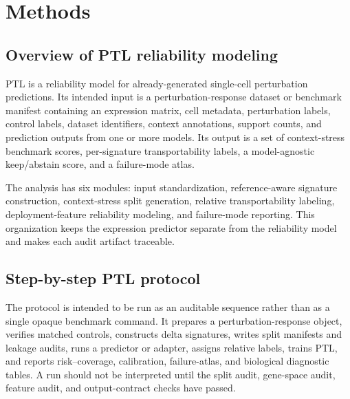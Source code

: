 \section{Methods}

\subsection{Overview of PTL reliability modeling}

PTL is a reliability model for already-generated single-cell perturbation predictions. Its intended input is a perturbation-response dataset or benchmark manifest containing an expression matrix, cell metadata, perturbation labels, control labels, dataset identifiers, context annotations, support counts, and prediction outputs from one or more models. Its output is a set of context-stress benchmark scores, per-signature transportability labels, a model-agnostic keep/abstain score, and a failure-mode atlas.

The analysis has six modules: input standardization, reference-aware signature construction, context-stress split generation, relative transportability labeling, deployment-feature reliability modeling, and failure-mode reporting. This organization keeps the expression predictor separate from the reliability model and makes each audit artifact traceable.

\subsection{Step-by-step PTL protocol}

The protocol is intended to be run as an auditable sequence rather than as a single opaque benchmark command. It prepares a perturbation-response object, verifies matched controls, constructs delta signatures, writes split manifests and leakage audits, runs a predictor or adapter, assigns relative labels, trains PTL, and reports risk--coverage, calibration, failure-atlas, and biological diagnostic tables. A run should not be interpreted until the split audit, gene-space audit, feature audit, and output-contract checks have passed.

